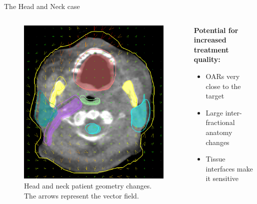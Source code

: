 \begin{frame}[c]{The Head and Neck case}
    \begin{columns}[c]
        \begin{column}[c]{0.45\textwidth}
            \begin{figure}[h]
                \centering
                \includegraphics[width=\textwidth]{imgs/patient_deformation.png}
                \caption{Head and neck patient geometry changes. The arrows represent the vector field.}
            \end{figure}
        \end{column}
        \begin{column}{0.55\textwidth}
            \textbf{Potential for increased treatment quality:}
            \begin{itemize}
                \item OARs very close to the target
                \item Large inter-fractional anatomy changes
                \item Tissue interfaces make it sensitive
            \end{itemize}
        \end{column}
    \end{columns}
\end{frame}

